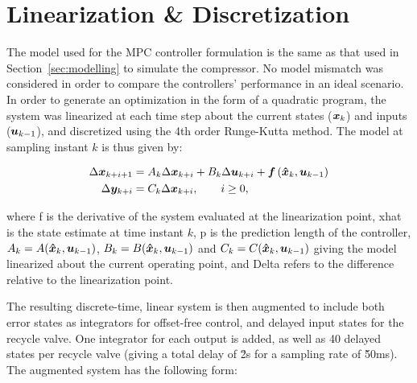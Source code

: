 \section{Linearization \& Discretization}
\label{sec:mpc:linearization}

The model used for the MPC controller formulation is the same as that used in Section~\ref{sec:modelling} to simulate the compressor.
No model mismatch was considered in order to compare the controllers' performance in an ideal scenario.
In order to generate an optimization in the form of a quadratic program, the system was linearized at each time step about the current states ($\bm{x}_k$) and inputs ($\bm{u}_{k-1}$), and discretized using the 4th order Runge-Kutta method.
The model at sampling instant $k$ is thus given by:

\begin{equation}
  \begin{split}
    \Delta \bm{x}_{k+i+1} & = A_k\Delta \bm{x}_{k+i} + B_k\Delta \bm{u}_{k+i} + \bm{f}\left( \bm{\hat{x}}_{k}, \bm{u}_{k-1} \right)\\
    \Delta \bm{y}_{k+i} & = C_k\Delta \bm{x}_{k+i}, \qquad
    i \geq 0,
  \end{split}
\end{equation}

\noindent where \gls*{f} is the derivative of the system evaluated at the linearization point, \gls*{xhat} is the state estimate at time instant $k$, \gls*{p} is the prediction length of the controller, $A_k = A(\bm{\hat{x}}_k, \bm{u}_{k-1})$, $B_k = B(\bm{\hat{x}}_k, \bm{u}_{k-1})$ and $C_k = C(\bm{\hat{x}}_k, \bm{u}_{k-1})$ giving the model linearized about the current operating point, and \gls*{Delta} refers to the difference relative to the linearization point.

The resulting discrete-time, linear system is then augmented to include both error states as integrators for offset-free control, and delayed input states for the recycle valve.
One integrator for each output is added, as well as 40 delayed states per recycle valve (giving a total delay of \u{2}{s} for a sampling rate of \u{50}{ms}).
The augmented system has the following form:

